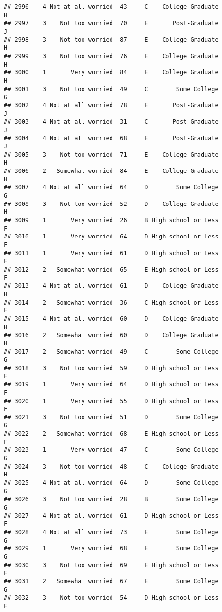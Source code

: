 \documentclass[
]{article}
\begin{document}
\begin{verbatim}
## 2996    4 Not at all worried  43     C    College Graduate         H
## 2997    3    Not too worried  70     E       Post-Graduate         J
## 2998    3    Not too worried  87     E    College Graduate         H
## 2999    3    Not too worried  76     E    College Graduate         H
## 3000    1       Very worried  84     E    College Graduate         H
## 3001    3    Not too worried  49     C        Some College         G
## 3002    4 Not at all worried  78     E       Post-Graduate         J
## 3003    4 Not at all worried  31     C       Post-Graduate         J
## 3004    4 Not at all worried  68     E       Post-Graduate         J
## 3005    3    Not too worried  71     E    College Graduate         H
## 3006    2   Somewhat worried  84     E    College Graduate         H
## 3007    4 Not at all worried  64     D        Some College         G
## 3008    3    Not too worried  52     D    College Graduate         H
## 3009    1       Very worried  26     B High school or Less         F
## 3010    1       Very worried  64     D High school or Less         F
## 3011    1       Very worried  61     D High school or Less         F
## 3012    2   Somewhat worried  65     E High school or Less         F
## 3013    4 Not at all worried  61     D    College Graduate         H
## 3014    2   Somewhat worried  36     C High school or Less         F
## 3015    4 Not at all worried  60     D    College Graduate         H
## 3016    2   Somewhat worried  60     D    College Graduate         H
## 3017    2   Somewhat worried  49     C        Some College         G
## 3018    3    Not too worried  59     D High school or Less         F
## 3019    1       Very worried  64     D High school or Less         F
## 3020    1       Very worried  55     D High school or Less         F
## 3021    3    Not too worried  51     D        Some College         G
## 3022    2   Somewhat worried  68     E High school or Less         F
## 3023    1       Very worried  47     C        Some College         G
## 3024    3    Not too worried  48     C    College Graduate         H
## 3025    4 Not at all worried  64     D        Some College         G
## 3026    3    Not too worried  28     B        Some College         G
## 3027    4 Not at all worried  61     D High school or Less         F
## 3028    4 Not at all worried  73     E        Some College         G
## 3029    1       Very worried  68     E        Some College         G
## 3030    3    Not too worried  69     E High school or Less         F
## 3031    2   Somewhat worried  67     E        Some College         G
## 3032    3    Not too worried  54     D High school or Less         F

\end{verbatim}
\end{document}
